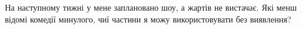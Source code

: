\documentclass[border=0pt,varwidth=15.4cm]{standalone}
\begin{document}
\fontsize{10}{13}\selectfont
\raggedright На наступному тижні у мене заплановано шоу, а жартів не вистачає. Які менш відомі комедії минулого, чиї частини я можу використовувати без виявлення?
\end{document}
